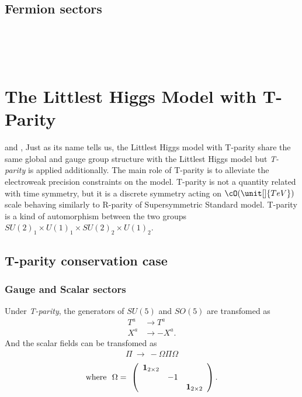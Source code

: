 


% 
\subsection*{Fermion sectors}
\\
\\
\\




\section{The Littlest Higgs Model with T-Parity}
 and \cite{Cheng:2004yc},
Just as its name tells us, the Littlest Higgs model with T-parity share the same global and gauge group structure with the Littlest Higgs model 
but \emph{T-parity} is applied additionally. 
The main role of T-parity is to alleviate the electroweak precision constraints on the model.
T-parity is not a quantity related with time symmetry, but it is a discrete symmetry acting on $\cO(\unit[]{TeV})$ scale
behaving similarly to R-parity of Supersymmetric Standard model.  
T-parity is a kind of automorphism between the two groups $SU(2)_1\times U(1)_1 \times SU(2)_2 \times U(1)_2 $.



\subsection{T-parity conservation case}
\subsubsection*{Gauge and Scalar sectors}
Under \emph{T-parity}, the generators of $SU(5)$ and $SO(5)$ are transfomed as
\begin{align}
 T^a &\to T^a \nonumber\\
 X^a &\to - X^a.  \nonumber
\end{align}
And the scalar fields can be transfomed as 
\begin{align}
  \Pi ~\to~ -\Omega \Pi \Omega 
  \end{align}
  \begin{align}
  {\rm{where~~}}\Omega =~\left( \begin{array}{ccc} \mathbf{1}_{2\times2}&& \\ &-1& \\ &&\mathbf{1}_{2\times2}  \end{array}\right). \nonumber
\end{align}



